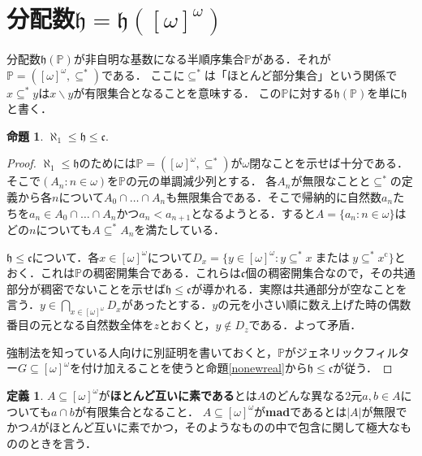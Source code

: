 \documentclass[uplatex,dvipdfmx]{jsarticle}
\renewcommand{\P}{\mathbb{P}}
\newcommand{\h}{\mathfrak{h}}
\newcommand{\frakc}{\mathfrak{c}}
\newcommand{\OR}{\mathbin{\text{または}}}
\renewcommand\subset{\subseteq}
\renewcommand{\setminus}{\smallsetminus}
\theoremstyle{definition}
\newtheorem*{defi*}{定義}
\newtheorem{prop}[thm]{命題}
\theoremstyle{named}
\begin{document}
\section{分配数$\h = \h([\omega]^\omega)$}

分配数$\h(\P)$が非自明な基数になる半順序集合$\P$がある．それが$\P = ([\omega]^\omega, \subset^*)$である．
ここに$\subset^*$は「ほとんど部分集合」という関係で$x \subset^* y$は$x \setminus y$が有限集合となることを意味する．
この$\P$に対する$\h(\P)$を単に$\h$と書く．

\begin{prop}
$\aleph_1 \le \h \le \mathfrak{c}$.
\end{prop}
\begin{proof}
$\aleph_1 \le \h$のためには$\P = ([\omega]^\omega, \subset^*)$が$\omega$閉なことを示せば十分である．
そこで$(A_n : n \in \omega)$を$\P$の元の単調減少列とする．
各$A_n$が無限なことと$\subset^*$の定義から各$n$について$A_0 \cap \dots \cap A_n$も無限集合である．そこで帰納的に自然数$a_n$たちを$a_n \in A_0 \cap \dots \cap A_n$かつ$a_n < a_{n+1}$となるようとる．すると$A = \{ a_n : n \in \omega \}$はどの$n$についても$A \subset^* A_n$を満たしている．

$\h \le \mathfrak{c}$について．各$x \in [\omega]^\omega$について$D_x = \{ y \in [\omega]^\omega : y \subset^* x \OR y \subset^* x^\mathrm{c} \}$とおく．これは$\P$の稠密開集合である．これらは$\frakc$個の稠密開集合なので，その共通部分が稠密でないことを示せば$\h \le \mathfrak{c}$が導かれる．実際は共通部分が空なことを言う．$y \in \bigcap_{x \in [\omega]^\omega} D_x$があったとする．$y$の元を小さい順に数え上げた時の偶数番目の元となる自然数全体を$z$とおくと，$y \not \in D_z$である．よって矛盾．

強制法を知っている人向けに別証明を書いておくと，$\P$がジェネリックフィルター$G \subset [\omega]^\omega$を付け加えることを使うと命題\ref{nonewreal}から$\h \le \mathfrak{c}$が従う．
\end{proof}

\begin{defi*}
$A \subset [\omega]^\omega$が{\bfseries ほとんど互いに素である}とは$A$のどんな異なる2元$a, b \in A$についても$a \cap b$が有限集合となること．
$A \subset [\omega]^\omega$が{\bfseries mad}であるとは$|A|$が無限でかつ$A$がほとんど互いに素でかつ，そのようなものの中で包含に関して極大なもののときを言う．
\end{defi*}
\end{document}
